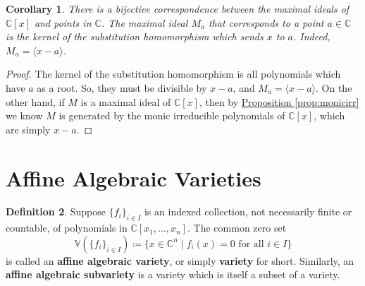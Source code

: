 \documentclass[letterpaper]{article}
\newtheorem{theorem}{Theorem}[section]
\newtheorem{corollary}[theorem]{Corollary}
\theoremstyle{definition}
\newtheorem{definition}[theorem]{Definition}
\theoremstyle{remark}
\newcommand\CC{\mathbb{C}}
\newcommand\VV{\mathbb{V}}
\newcommand{\defeq}{\coloneqq}
\begin{document}
\begin{corollary}
	There is a bijective correspondence between the maximal ideals of \(\CC[x]\) and points in \(\CC{}\). The maximal ideal \(M_a\) that corresponds to a point \(a\in\CC\) is the kernel of the substitution homomorphism which sends \(x\) to \(a\). Indeed, \(M_a=\langle x-a\rangle\). 
\end{corollary}

\begin{proof}
	The kernel of the substitution homomorphism is all polynomials which have \(a\) as a root. So, they must be divisible by \(x-a\), and \(M_a=\langle x-a\rangle\). On the other hand, if \(M\) is a maximal ideal of \(\CC[x]\), then by \hyperref[prop:monicirr]{Proposition \ref*{prop:monicirr}} we know \(M\) is generated by the monic irreducible polynomials of \(\CC[x]\), which are simply \(x-a\). 
\end{proof}





\section{Affine Algebraic Varieties}

\begin{definition}
    Suppose $\{f_i\}_{i\in I}$ is an indexed collection, not necessarily finite or countable, of polynomials in \(\CC[x_1,\dots,x_n]\). The common zero set \[\VV(\{f_i\}_{i\in I})\defeq \{x\in \CC^n\mid f_i(x)=0\text{ for all }i\in I\} \] is called an \textbf{affine algebraic variety}, or simply \textbf{variety} for short. Similarly, an \textbf{affine algebraic subvariety} is a variety which is itself a subset of a variety. 
\end{definition}
\end{document}
